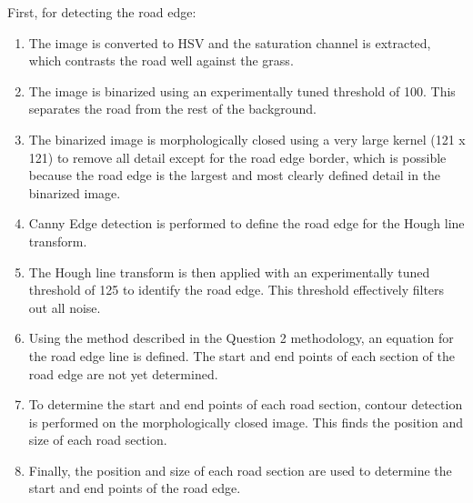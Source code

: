 First, for detecting the road edge:
\begin{enumerate}
  \item The image is converted to HSV and the saturation channel is extracted, which contrasts the road well against the grass.

  \item The image is binarized using an experimentally tuned threshold of 100. This separates the road from the rest of the background.

  \item The binarized image is morphologically closed using a very large kernel (121 x 121) to remove all detail except for the road edge border, which is possible because the road edge is the largest and most clearly defined detail in the binarized image.

  \item Canny Edge detection is performed to define the road edge for the Hough line transform.

  \item The Hough line transform is then applied with an experimentally tuned threshold of 125 to identify the road edge. This threshold effectively filters out all noise.

  \item Using the method described in the Question 2 methodology, an equation for the road edge line is defined. The start and end points of each section of the road edge are not yet determined.

  \item To determine the start and end points of each road section, contour detection is performed on the morphologically closed image. This finds the position and size of each road section.

  \item Finally, the position and size of each road section are used to determine the start and end points of the road edge.

\end{enumerate}

\newpage

